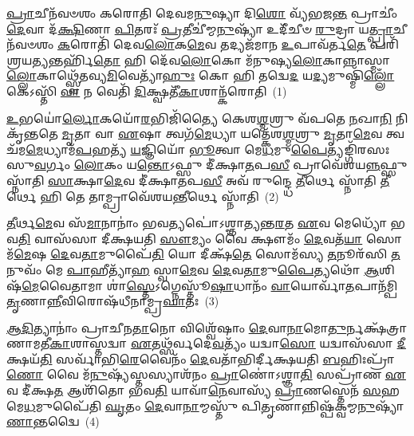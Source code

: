 \setcounter{anuvakam}{0}
\-\ul{𑌪𑍍𑌰𑌾}\-𑌚𑍀𑌨᳴𑌵𑍞𑌶𑌂 𑌕𑌰𑍋𑌤𑌿 𑌦𑍇𑌵𑌮\-\ul{𑌨𑍁}\-𑌷𑍍𑌯𑌾 𑌦𑌿\-\ul{𑌶𑍋} 𑌵𑍍𑌯᳴𑌭𑌜\-\ul{𑌨𑍍𑌤} 𑌪𑍍𑌰𑌾𑌚𑍀𑌂॑ \ul{𑌦𑍇}\-𑌵𑌾 𑌦᳴\-\ul{𑌕𑍍𑌷𑌿}\-𑌣𑌾 \ul{𑌪𑌿}\-𑌤𑌰𑌃᳴ \ul{𑌪𑍍𑌰}\-𑌤𑍀𑌚𑍀॑𑌮𑍍𑌮\-\ul{𑌨𑍁}\-𑌷𑍍𑌯𑌾᳴ 𑌉𑌦𑍀᳴𑌚𑍀𑍞 \ul{𑌰𑍁}\-𑌦𑍍𑌰𑌾 𑌯\-\ul{𑌤𑍍𑌪𑍍𑌰𑌾}\-𑌚𑍀𑌨᳴𑌵𑍞𑌶𑌂 \ul{𑌕}\-𑌰𑍋𑌤𑌿᳴ 𑌦𑍇𑌵\-\ul{𑌲𑍋}\-𑌕\-\ul{𑌮𑍇}\-𑌵 𑌤𑌦𑍍𑌯𑌜᳴𑌮𑌾𑌨 \ul{𑌉}\-𑌪𑌾𑌵᳴𑌰𑍍𑌤\-\ul{𑌤𑍇} 𑌪𑌰𑌿᳴ 𑌶𑍍𑌰𑌯\-\ul{𑌤𑍍𑌯}\-𑌨𑍍𑌤𑌰𑍍\mbox{}𑌹𑌿᳴\-\ul{𑌤𑍋} 𑌹𑌿 𑌦𑍇᳴𑌵\-\ul{𑌲𑍋}\-𑌕𑍋 𑌮᳴𑌨𑍁𑌷𑍍𑌯\-\ul{𑌲𑍋}\-𑌕𑌾\-𑌨𑍍𑌨𑌾𑌸𑍍𑌮𑌾\-\ul{𑌲𑍍𑌲𑍋}\-𑌕𑌾𑌥𑍍𑌸𑍍𑌵𑍇᳴𑌤𑌵𑍍𑌯\-\ul{𑌮𑌿}\-𑌵𑍇𑌤𑍍𑌯𑌾᳴\-\ul{𑌹𑍁𑌃} 𑌕𑍋 𑌹𑌿 𑌤𑌦𑍍𑌵𑍇\-\ul{𑌦} 𑌯\-\ul{𑌦𑍍𑌯}\-𑌮𑍁𑌷𑍍𑌮𑌿᳴\-\ul{𑌲𑍍𑌲𑍋𑌁}\-𑌕𑍇\-𑌽𑌸𑍍𑌤𑌿᳴ \ul{𑌵𑌾} 𑌨 𑌵𑍇𑌤𑌿᳴ \ul{𑌦𑌿}\-𑌕𑍍𑌷𑍍𑌵𑌤𑍀᳴\-\ul{𑌕𑌾}\-𑌶𑌾𑌨𑍍𑌕᳴𑌰𑍋𑌤𑌿~(1)

\-\ul{𑌉}\-𑌭𑌯𑍋॑\-\ul{𑌰𑍍𑌲𑍋}\-𑌕𑌯𑍋᳴\-\ul{𑌰}\-𑌭𑌿𑌜𑌿᳴𑌤𑍍𑌯𑍈 𑌕𑍇𑌶\-\ul{𑌶𑍍𑌮}\-𑌶𑍍𑌰𑍁 𑌵᳴𑌪𑌤𑍇 \ul{𑌨}\-𑌖𑌾\-\ul{𑌨𑌿} 𑌨𑌿 𑌕𑍃᳴𑌨𑍍𑌤𑌤𑍇 \ul{𑌮𑍃}\-𑌤𑌾 𑌵𑌾 \ul{𑌏}\-𑌷𑌾 𑌤𑍍𑌵𑌗᳴\-\ul{𑌮𑍇}\-𑌧𑍍𑌯𑌾 𑌯𑌤𑍍𑌕𑍇᳴𑌶\-\ul{𑌶𑍍𑌮}\-𑌶𑍍𑌰𑍁 \ul{𑌮𑍃}\-𑌤𑌾\-\ul{𑌮𑍇}\-𑌵 𑌤𑍍𑌵𑌚᳴𑌮\-\ul{𑌮𑍇}\-𑌧𑍍𑌯𑌾𑌮᳴\-\ul{𑌪}\-𑌹𑌤𑍍𑌯᳴ \ul{𑌯}\-𑌜𑍍𑌞𑌿𑌯𑍋᳴ \ul{𑌭𑍂}\-𑌤𑍍𑌵𑌾 𑌮𑍇\-\ul{𑌧}\-𑌮𑍁\-\ul{𑌪𑍈}\-𑌤𑍍𑌯𑌙𑍍𑌗𑌿᳴𑌰𑌸𑌃 𑌸𑍁\-\ul{𑌵}\-𑌰𑍍𑌗𑌂 \ul{𑌲𑍋}\-𑌕𑌂 𑌯\-\ul{𑌨𑍍𑌤𑍋}\-\-𑌽𑌫𑍍𑌸𑍁 𑌦𑍀॑𑌕𑍍𑌷𑌾\-\ul{𑌤}\-𑌪\-\ul{𑌸𑍀} 𑌪𑍍𑌰𑌾𑌵𑍇᳴𑌶𑌯\-\ul{𑌨𑍍𑌨}\-𑌫𑍍𑌸𑍁 𑌸𑍍𑌨𑌾᳴𑌤𑌿 \ul{𑌸𑌾}\-𑌕𑍍𑌷𑌾\-\ul{𑌦𑍇}\-𑌵 𑌦𑍀॑𑌕𑍍𑌷𑌾\-\ul{𑌤}\-𑌪\-\ul{𑌸𑍀} 𑌅𑌵᳴ 𑌰𑍁𑌨𑍍𑌦𑍍𑌧𑍇 \ul{𑌤𑍀}\-𑌰𑍍𑌥𑍇 𑌸𑍍𑌨𑌾᳴𑌤𑌿 \ul{𑌤𑍀}\-𑌰𑍍𑌥𑍇 𑌹𑌿 𑌤𑍇 𑌤𑌾𑌮𑍍𑌪𑍍𑌰𑌾𑌵𑍇᳴𑌶𑌯\-\ul{𑌨𑍍𑌤𑍀}\-𑌰𑍍𑌥𑍇 𑌸𑍍𑌨𑌾᳴𑌤𑌿~(2)

\-\ul{𑌤𑍀}\-𑌰𑍍𑌥\-\ul{𑌮𑍇}\-𑌵 𑌸᳴\-\ul{𑌮𑌾}\-𑌨𑌾𑌨𑌾𑌂॑ 𑌭𑌵\-\ul{𑌤𑍍𑌯}\-𑌪𑍋॑\-𑌽𑌶𑍍𑌞𑌾𑌤𑍍𑌯𑌨𑍍𑌤\-\ul{𑌰}\-𑌤 \ul{𑌏}\-𑌵 𑌮𑍇𑌧𑍍𑌯𑍋᳴ 𑌭𑌵\-\ul{𑌤𑌿} 𑌵𑌾𑌸᳴𑌸𑌾 𑌦𑍀𑌕𑍍𑌷𑌯𑌤𑌿 \ul{𑌸𑍗}\-𑌮𑍍𑌯𑌂 𑌵𑍈 𑌕𑍍𑌷𑍗𑌮𑌂᳴ \ul{𑌦𑍇}\-𑌵𑌤᳴\-\ul{𑌯𑌾} 𑌸𑍋𑌮᳴\-\ul{𑌮𑍇}\-𑌷 \ul{𑌦𑍇}\-𑌵\-\ul{𑌤𑌾}\-𑌮𑍁𑌪𑍈᳴\-\ul{𑌤𑌿} 𑌯𑍋 𑌦𑍀𑌕𑍍𑌷᳴\-\ul{𑌤𑍇} 𑌸𑍋𑌮᳴𑌸𑍍𑌯 \ul{𑌤}\-𑌨𑍂𑌰᳴𑌸𑌿 \ul{𑌤}\-𑌨𑍁𑌵𑌂᳴ 𑌮𑍇 \ul{𑌪𑌾}\-𑌹𑍀𑌤𑍍𑌯𑌾᳴\-\ul{𑌹} 𑌸𑍍𑌵𑌾\-\ul{𑌮𑍇}\-𑌵 \ul{𑌦𑍇}\-𑌵\-\ul{𑌤𑌾}\-𑌮𑍁\-\ul{𑌪𑍈}\-𑌤𑍍𑌯𑌥𑍋᳴ \ul{𑌆}\-𑌶𑌿𑌷᳴\-\ul{𑌮𑍇}\-𑌵𑍈𑌤𑌾𑌮𑌾 𑌶𑌾॑\-\ul{𑌸𑍍𑌤𑍇}\-\-𑌽𑌗𑍍𑌨𑍇𑌸𑍍𑌤𑍂᳴\-\ul{𑌷𑌾}\-𑌧𑌾𑌨𑌂᳴ \ul{𑌵𑌾}\-𑌯𑍋𑌰𑍍𑌵𑌾᳴\-\ul{𑌤}\-𑌪𑌾𑌨᳴𑌮𑍍𑌪𑌿\-\ul{𑌤𑍃}\-𑌣𑌾\-\ul{𑌨𑍍𑌨𑍀}\-𑌵𑌿𑌰𑍋𑌷᳴𑌧𑍀𑌨𑌾𑌮𑍍𑌪𑍍𑌰\-\ul{𑌘𑌾}\-𑌤𑌃~(3)

\-\ul{𑌆}\-\-\ul{𑌦𑌿}\-𑌤𑍍𑌯𑌾𑌨𑌾𑌂॑ 𑌪𑍍𑌰𑌾𑌚𑍀𑌨\-\ul{𑌤𑌾}\-𑌨𑍋 𑌵𑌿𑌶𑍍𑌵𑍇᳴𑌷𑌾𑌂 \ul{𑌦𑍇}\-𑌵𑌾\-\ul{𑌨𑌾}\-𑌮𑍋\-\ul{𑌤𑍁}\-𑌰𑍍𑌨𑌕𑍍𑌷᳴𑌤𑍍𑌰𑌾𑌣𑌾𑌮𑌤𑍀\-\ul{𑌕𑌾}\-𑌶𑌾𑌸𑍍𑌤𑌦𑍍𑌵𑌾 \ul{𑌏}\-𑌤𑌥𑍍𑌸᳴𑌰𑍍𑌵𑌦𑍇\-\ul{𑌵}\-𑌤𑍍𑌯𑌂᳴ 𑌯𑌦𑍍𑌵𑌾\-\ul{𑌸𑍋} 𑌯𑌦𑍍𑌵𑌾𑌸᳴𑌸𑌾 \ul{𑌦𑍀}\-𑌕𑍍𑌷𑌯᳴\-\ul{𑌤𑌿} 𑌸𑌰𑍍𑌵𑌾᳴𑌭𑌿\-\ul{𑌰𑍇}\-𑌵𑍈𑌨𑌂᳴ \ul{𑌦𑍇}\-𑌵𑌤𑌾᳴𑌭𑌿𑌰𑍍𑌦𑍀𑌕𑍍𑌷𑌯𑌤𑌿 \ul{𑌬}\-𑌹𑌿𑌃𑌪𑍍𑌰𑌾᳴\-\ul{𑌣𑍋} 𑌵𑍈 𑌮᳴\-\ul{𑌨𑍁}\-𑌷𑍍𑌯᳴𑌸𑍍𑌤𑌸𑍍𑌯𑌾𑌶᳴𑌨𑌂 \ul{𑌪𑍍𑌰𑌾}\-𑌣𑍋॑\-𑌽𑌶𑍍𑌞𑌾\-\ul{𑌤𑌿} 𑌸𑌪𑍍𑌰𑌾᳴𑌣 \ul{𑌏}\-𑌵 𑌦𑍀॑𑌕𑍍𑌷\-\ul{𑌤} 𑌆𑌶𑌿᳴𑌤𑍋 𑌭𑌵\-\ul{𑌤𑌿} 𑌯𑌾𑌵𑌾᳴\-\ul{𑌨𑍇}\-𑌵𑌾𑌸𑍍𑌯᳴ \ul{𑌪𑍍𑌰𑌾}\-𑌣𑌸𑍍𑌤𑍇𑌨᳴ \ul{𑌸}\-𑌹 𑌮𑍇\-\ul{𑌧}\-𑌮𑍁𑌪𑍈᳴𑌤𑌿 \ul{𑌘𑍃}\-𑌤𑌂 \ul{𑌦𑍇}\-𑌵𑌾\-\ul{𑌨𑌾}\-𑌮𑍍𑌮𑌸𑍍𑌤𑍁᳴ 𑌪𑌿\-\ul{𑌤𑍃}\-𑌣𑌾𑌨𑍍𑌨𑌿𑌷𑍍𑌪᳴𑌕𑍍𑌵𑌮𑍍𑌮\-\ul{𑌨𑍁}\-𑌷𑍍𑌯𑌾᳴\-\ul{𑌣𑌾}\-𑌨𑍍𑌤𑌦𑍍𑌵𑍈~(4)

